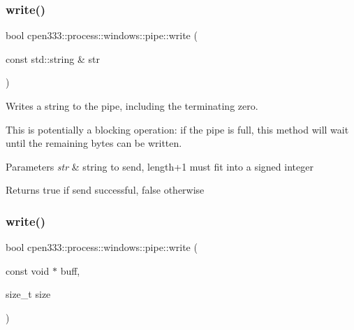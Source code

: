 \subsubsection{\texorpdfstring{write()}{write()}\hspace{0.1cm}{\footnotesize\ttfamily [1/2]}}
{\footnotesize\ttfamily bool cpen333\+::process\+::windows\+::pipe\+::write (\begin{DoxyParamCaption}\item[{const std\+::string \&}]{str }\end{DoxyParamCaption})\hspace{0.3cm}{\ttfamily [inline]}}



Writes a string to the pipe, including the terminating zero. 

This is potentially a blocking operation\+: if the pipe is full, this method will wait until the remaining bytes can be written.


\begin{DoxyParams}{Parameters}
{\em str} & string to send, length+1 must fit into a signed integer \\
\hline
\end{DoxyParams}
\begin{DoxyReturn}{Returns}
true if send successful, false otherwise 
\end{DoxyReturn}
\mbox{\label{classcpen333_1_1process_1_1windows_1_1pipe_a072e8bded1b6f0a45683875ed3be1aa2}} 
\subsubsection{\texorpdfstring{write()}{write()}\hspace{0.1cm}{\footnotesize\ttfamily [2/2]}}
{\footnotesize\ttfamily bool cpen333\+::process\+::windows\+::pipe\+::write (\begin{DoxyParamCaption}\item[{const void $\ast$}]{buff,  }\item[{size\+\_\+t}]{size }\end{DoxyParamCaption})\hspace{0.3cm}{\ttfamily [inline]}}



